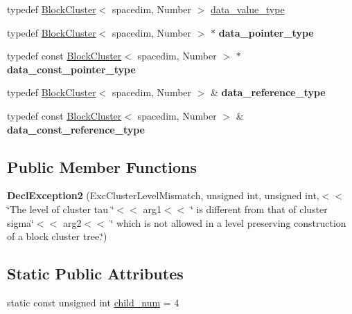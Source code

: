 \begin{DoxyCompactItemize}
\item 
typedef \hyperlink{classBlockCluster}{Block\+Cluster}$<$ spacedim, Number $>$ \hyperlink{classBlockClusterTree_a4d03fe184a7f7838111b27cdae056a62}{data\+\_\+value\+\_\+type}
\item 
\mbox{\label{classBlockClusterTree_a0480a48aa335fd1adeec9ffdc8086193}} 
typedef \hyperlink{classBlockCluster}{Block\+Cluster}$<$ spacedim, Number $>$ $\ast$ {\bfseries data\+\_\+pointer\+\_\+type}
\item 
\mbox{\label{classBlockClusterTree_a179b726b207148de1b866d5c36915809}} 
typedef const \hyperlink{classBlockCluster}{Block\+Cluster}$<$ spacedim, Number $>$ $\ast$ {\bfseries data\+\_\+const\+\_\+pointer\+\_\+type}
\item 
\mbox{\label{classBlockClusterTree_a62869615d2fd6ec6bf58163e3b36bca1}} 
typedef \hyperlink{classBlockCluster}{Block\+Cluster}$<$ spacedim, Number $>$ \& {\bfseries data\+\_\+reference\+\_\+type}
\item 
\mbox{\label{classBlockClusterTree_a3ae82489506a1d2a0ff3cf0a4039b9f9}} 
typedef const \hyperlink{classBlockCluster}{Block\+Cluster}$<$ spacedim, Number $>$ \& {\bfseries data\+\_\+const\+\_\+reference\+\_\+type}
\end{DoxyCompactItemize}
\subsection*{Public Member Functions}
\begin{DoxyCompactItemize}
\item 
\mbox{\label{classBlockClusterTree_a967049a8deecb49c36492ffdf64349cd}} 
{\bfseries Decl\+Exception2} (Exc\+Cluster\+Level\+Mismatch, unsigned int, unsigned int,$<$$<$ \char`\"{}The level of cluster tau \char`\"{}$<$$<$ arg1$<$$<$ \char`\"{} is different from that of cluster sigma\char`\"{}$<$$<$ arg2$<$$<$ \char`\"{} which is not allowed in a level preserving construction of a block cluster tree.\char`\"{})
\end{DoxyCompactItemize}
\subsection*{Static Public Attributes}
\begin{DoxyCompactItemize}
\item 
static const unsigned int \hyperlink{classBlockClusterTree_a000c439b578bcf4fa28b7f3edd6079e9}{child\+\_\+num} = 4
\end{DoxyCompactItemize}
